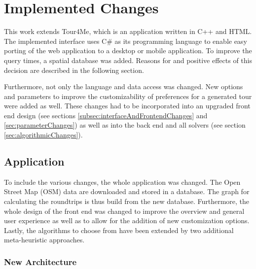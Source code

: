 \chapter{Implemented Changes}
\label{chapter:implementedChanges}

This work extends Tour4Me, which is an application written in C++ and HTML. 
The implemented interface uses C\# as its programming language to enable easy porting of the web application to a desktop or mobile application.
To improve the query times, a spatial database was added. 
Reasons for and positive effects of this decision are described in the following section.

Furthermore, not only the language and data access was changed.
New options and parameters to improve the customizability of preferences for a generated tour were added as well.
These changes had to be incorporated into an upgraded front end design (see sections \ref{subsec:interfaceAndFrontendChanges} and \ref{sec:parameterChanges}) as well as into the back end and all solvers (see section \ref{sec:algorithmicChanges}). 


\section{Application}
\label{sec:application}

To include the various changes, the whole application was changed.
The Open Street Map (OSM) data are downloaded and stored in a database.
The graph for calculating the roundtrips is thus build from the new database.
Furthermore, the whole design of the front end was changed to improve the overview and general user experience as well as to allow for the addition of new customization options.
Lastly, the algorithms to choose from have been extended by two additional meta-heuristic approaches.

\subsection{New Architecture}
\label{sec:newArchitecture}


